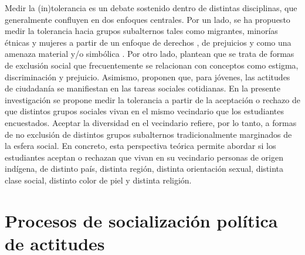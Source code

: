 \documentclass[12pt,twoside]{templates/facsothesis}
\begin{document}
Medir la (in)tolerancia es un debate sostenido dentro de distintas disciplinas, que generalmente confluyen en dos enfoques centrales. Por un lado, se ha propuesto medir la tolerancia hacia grupos subalternos tales como migrantes, minorías étnicas y mujeres a partir de un enfoque de derechos \citep{miranda_Political_2018, trevino_Influence_2018}, de prejuicios \citep{meeusen_ParentChild_2015, weber_educational_2020} y como una amenaza material y/o simbólica \citep{raijman_Perceived_2004}. Por otro lado, \citet{diez-nicolas_Exclusion_2019} plantean que se trata de formas de exclusión social que frecuentemente se relacionan con conceptos como estigma, discriminación y prejuicio. Asimismo, \citet{tendam_Measuring_2011} proponen que, para jóvenes, las actitudes de ciudadanía se manifiestan en las tareas sociales cotidianas. En la presente investigación se propone medir la tolerancia a partir de la aceptación o rechazo de que distintos grupos sociales vivan en el mismo vecindario que los estudiantes encuestados. Aceptar la diversidad en el vecindario refiere, por lo tanto, a formas de no exclusión de distintos grupos subalternos tradicionalmente marginados de la esfera social. En concreto, esta perspectiva teórica permite abordar si los estudiantes aceptan o rechazan que vivan en su vecindario personas de origen indígena, de distinto país, distinta región, distinta orientación sexual, distinta clase social, distinto color de piel y distinta religión.

\hypertarget{procesos-de-socializaciuxf3n-poluxedtica-de-actitudes}{%
\section{Procesos de socialización política de actitudes}\label{procesos-de-socializaciuxf3n-poluxedtica-de-actitudes}}
\end{document}
